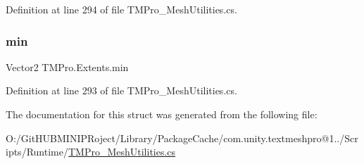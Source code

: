 Definition at line 294 of file T\+M\+Pro\+\_\+\+Mesh\+Utilities.\+cs.

\mbox{\label{struct_t_m_pro_1_1_extents_ad0a4cd82c4401ee45b524969f1395d5a}} 
\subsubsection{\texorpdfstring{min}{min}}
{\footnotesize\ttfamily Vector2 T\+M\+Pro.\+Extents.\+min}



Definition at line 293 of file T\+M\+Pro\+\_\+\+Mesh\+Utilities.\+cs.



The documentation for this struct was generated from the following file\+:\begin{DoxyCompactItemize}
\item 
O\+:/\+Git\+H\+U\+B\+M\+I\+N\+I\+P\+Roject/\+Library/\+Package\+Cache/com.\+unity.\+textmeshpro@1../\+Scripts/\+Runtime/\mbox{\hyperlink{_t_m_pro___mesh_utilities_8cs}{T\+M\+Pro\+\_\+\+Mesh\+Utilities.\+cs}}\end{DoxyCompactItemize}
